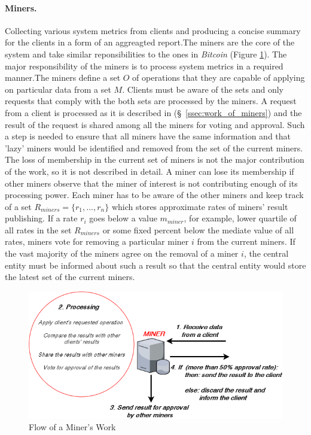 \documentclass[11px]{article}
\begin{document}
\paragraph{Miners.} Collecting various system metrics from clients and producing a concise summary for the clients in a form of an aggreagted report.The miners are the core of the system and take similar reponsibilities to the ones in \textit{Bitcoin} (Figure \ref{fig:miner_work_flow}). The major responsibility of the miners is to process system metrics in a required manner.The miners define a set $O$ of operations that they are capable of applying on particular data from a set $M$. Clients must be aware of the sets and only requests that comply with the both sets are processed by the miners. A request from a client is processed as it is described in (\S\ \ref{ssec:work_of_miners}) and the result of the request is shared among all the miners for voting and approval. Such a step is needed to ensure that all miners have the same information and that 'lazy' miners would be identified and removed from the set of the current miners. The loss of membership in the current set of miners is not the major contribution of the work, so it is not described in detail. A miner can lose its membership if other miners observe that the miner of interest is not contributing enough of its processing power. Each miner has to be aware of the other miners and keep track of a set $R_{miners} = \{r_1, ..., r_n\}$ which stores approximate rates of  miners' result publishing. If a rate $r_i$ goes below a value $m_{miner}$,  for example, lower quartile of all rates in the set $R_{miners}$ or some fixed percent below the mediate value of all rates, miners vote for removing a particular miner $i$ from the current miners. If the vast majority of the miners agree on the removal of a miner $i$,  the central entity must be informed about such a result so that the central entity would store the latest set of the current miners.
\par


\begin{figure}[h]
  \begin{center}
    \includegraphics[width=0.8\linewidth]{figures/miner_work_diagram.png}
    \caption{Flow of a Miner's Work}
    \label{fig:miner_work_flow}
  \end{center}
\end{figure}
\end{document}
